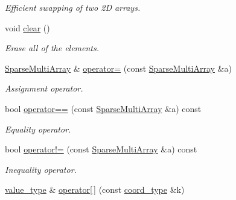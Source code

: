 \begin{DoxyCompactItemize}
\begin{DoxyCompactList}\small\item\em Efficient swapping of two 2\-D arrays. \end{DoxyCompactList}\item 
\hypertarget{class_d_o_1_1_sparse_multi_array_ac8bb3912a3ce86b15842e79d0b421204}{void \hyperlink{class_d_o_1_1_sparse_multi_array_ac8bb3912a3ce86b15842e79d0b421204}{clear} ()}\label{class_d_o_1_1_sparse_multi_array_ac8bb3912a3ce86b15842e79d0b421204}

\begin{DoxyCompactList}\small\item\em Erase all of the elements. \end{DoxyCompactList}\item 
\hypertarget{class_d_o_1_1_sparse_multi_array_a3a09e4b6b1d83553d805b190988e8e97}{\hyperlink{class_d_o_1_1_sparse_multi_array}{Sparse\-Multi\-Array} \& \hyperlink{class_d_o_1_1_sparse_multi_array_a3a09e4b6b1d83553d805b190988e8e97}{operator=} (const \hyperlink{class_d_o_1_1_sparse_multi_array}{Sparse\-Multi\-Array} \&a)}\label{class_d_o_1_1_sparse_multi_array_a3a09e4b6b1d83553d805b190988e8e97}

\begin{DoxyCompactList}\small\item\em Assignment operator. \end{DoxyCompactList}\item 
\hypertarget{class_d_o_1_1_sparse_multi_array_aaa3d8cf68eaa4f28a3320b36606d5e9d}{bool \hyperlink{class_d_o_1_1_sparse_multi_array_aaa3d8cf68eaa4f28a3320b36606d5e9d}{operator==} (const \hyperlink{class_d_o_1_1_sparse_multi_array}{Sparse\-Multi\-Array} \&a) const }\label{class_d_o_1_1_sparse_multi_array_aaa3d8cf68eaa4f28a3320b36606d5e9d}

\begin{DoxyCompactList}\small\item\em Equality operator. \end{DoxyCompactList}\item 
\hypertarget{class_d_o_1_1_sparse_multi_array_a5535cda5173e6de06f10f5d055142977}{bool \hyperlink{class_d_o_1_1_sparse_multi_array_a5535cda5173e6de06f10f5d055142977}{operator!=} (const \hyperlink{class_d_o_1_1_sparse_multi_array}{Sparse\-Multi\-Array} \&a) const }\label{class_d_o_1_1_sparse_multi_array_a5535cda5173e6de06f10f5d055142977}

\begin{DoxyCompactList}\small\item\em Inequality operator. \end{DoxyCompactList}\item 
\hypertarget{class_d_o_1_1_sparse_multi_array_a300969d60d0c092b583ae79889b3bd67}{\hyperlink{class_d_o_1_1_sparse_multi_array_a265a253612b46abed17c61b0a5e5ce30}{value\-\_\-type} \& \hyperlink{class_d_o_1_1_sparse_multi_array_a300969d60d0c092b583ae79889b3bd67}{operator\mbox{[}$\,$\mbox{]}} (const \hyperlink{class_d_o_1_1_sparse_multi_array_ae4fb477425bbeb20329d300396ac2582}{coord\-\_\-type} \&k)}\label{class_d_o_1_1_sparse_multi_array_a300969d60d0c092b583ae79889b3bd67}


\end{DoxyCompactItemize}
